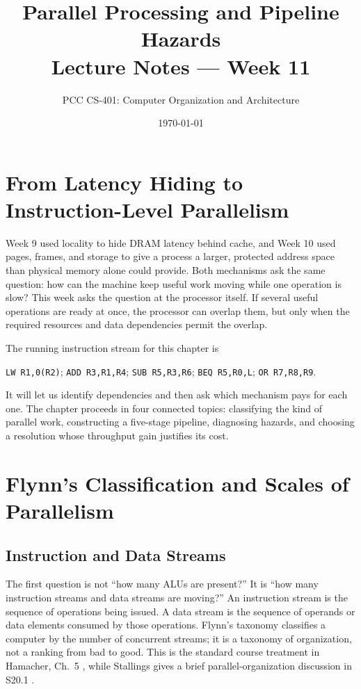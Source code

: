 \documentclass[11pt]{article}
\title{Parallel Processing and Pipeline Hazards\\\large Lecture Notes --- Week 11}
\author{PCC CS-401: Computer Organization and Architecture}
\date{\today}
\begin{document}
\maketitle

\section{From Latency Hiding to Instruction-Level Parallelism}
\label{sec:motivation}

Week 9 used locality to hide DRAM latency behind cache, and Week 10 used
pages, frames, and storage to give a process a larger, protected address space
than physical memory alone could provide. Both mechanisms ask the same
question: how can the machine keep useful work moving while one operation is
slow? This week asks the question at the processor itself. If several useful
operations are ready at once, the processor can overlap them, but only when
the required resources and data dependencies permit the overlap.

The running instruction stream for this chapter is
\begin{center}
\texttt{LW R1,0(R2)}; \texttt{ADD R3,R1,R4}; \texttt{SUB R5,R3,R6};
\texttt{BEQ R5,R0,L}; \texttt{OR R7,R8,R9}.
\end{center}
It will let us identify dependencies and then ask which mechanism pays for
each one. The chapter proceeds in four connected topics: classifying the kind
of parallel work, constructing a five-stage pipeline, diagnosing hazards, and
choosing a resolution whose throughput gain justifies its cost.

\section{Flynn's Classification and Scales of Parallelism}
\label{sec:flynn}

\subsection{Instruction and Data Streams}

The first question is not ``how many ALUs are present?'' It is ``how many
instruction streams and data streams are moving?'' An instruction stream is
the sequence of operations being issued. A data stream is the sequence of
operands or data elements consumed by those operations. Flynn's taxonomy
classifies a computer by the number of concurrent streams; it is a taxonomy of
organization, not a ranking from bad to good. This is the standard course
treatment in Hamacher, Ch.~5 \cite{Hamacher2002_computer_organization}, while
Stallings gives a brief parallel-organization discussion in S20.1
\cite{Stallings2015_computer_organization}.
\end{document}
